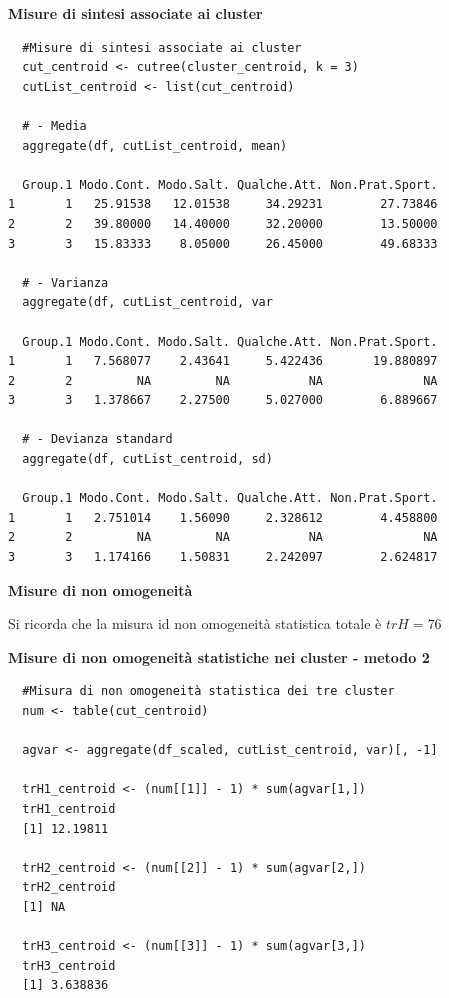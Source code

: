 \noindent \textbf{Misure di sintesi associate ai cluster}

\vspace{5mm}
\begin{lstlisting}
  #Misure di sintesi associate ai cluster
  cut_centroid <- cutree(cluster_centroid, k = 3)
  cutList_centroid <- list(cut_centroid)

  # - Media
  aggregate(df, cutList_centroid, mean)

  Group.1 Modo.Cont. Modo.Salt. Qualche.Att. Non.Prat.Sport.
1       1   25.91538   12.01538     34.29231        27.73846
2       2   39.80000   14.40000     32.20000        13.50000
3       3   15.83333    8.05000     26.45000        49.68333

  # - Varianza
  aggregate(df, cutList_centroid, var

  Group.1 Modo.Cont. Modo.Salt. Qualche.Att. Non.Prat.Sport.
1       1   7.568077    2.43641     5.422436       19.880897
2       2         NA         NA           NA              NA
3       3   1.378667    2.27500     5.027000        6.889667

  # - Devianza standard
  aggregate(df, cutList_centroid, sd)

  Group.1 Modo.Cont. Modo.Salt. Qualche.Att. Non.Prat.Sport.
1       1   2.751014    1.56090     2.328612        4.458800
2       2         NA         NA           NA              NA
3       3   1.174166    1.50831     2.242097        2.624817
\end{lstlisting}
\vspace{5mm}

\noindent \textbf{Misure di non omogeneità}

Si ricorda che la misura id non omogeneità statistica totale è $trH = 76$

\noindent \textbf{Misure di non omogeneità statistiche nei cluster - metodo 2}

\vspace{5mm}
\begin{lstlisting}
  #Misura di non omogeneità statistica dei tre cluster
  num <- table(cut_centroid)

  agvar <- aggregate(df_scaled, cutList_centroid, var)[, -1]

  trH1_centroid <- (num[[1]] - 1) * sum(agvar[1,])
  trH1_centroid
  [1] 12.19811

  trH2_centroid <- (num[[2]] - 1) * sum(agvar[2,])
  trH2_centroid
  [1] NA

  trH3_centroid <- (num[[3]] - 1) * sum(agvar[3,])
  trH3_centroid
  [1] 3.638836
\end{lstlisting}
\vspace{5mm}

